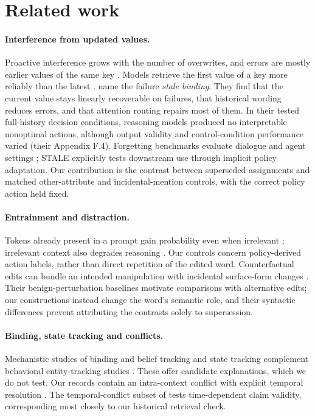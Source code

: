 \section{Related work}
\label{sec:related}

\paragraph{Interference from updated values.} Proactive interference grows with the number of overwrites,
and errors are mostly earlier values of the same key \citep{wang2026unable}. Models retrieve the first value
of a key more reliably than the latest \citep{chattaraj2026dual,qiao2026retrieval}. \citet{guo2026context}
name the failure \emph{stale binding}. They find that the current value stays linearly recoverable on
failures, that historical wording reduces errors, and that attention routing repairs most of them. In
their tested full-history decision conditions, reasoning models produced no interpretable nonoptimal
actions, although output validity and control-condition performance varied (their Appendix F.4).
Forgetting benchmarks evaluate dialogue and agent settings \citep{qian2026forget,chao2026stale}; STALE
explicitly tests downstream use through implicit policy adaptation. Our contribution is the contrast
between superseded assignments and matched other-attribute and incidental-mention controls, with the
correct policy action held fixed.

\paragraph{Entrainment and distraction.} Tokens already present in a prompt gain probability even when
irrelevant \citep{niu2025entrainment}; irrelevant context also degrades reasoning \citep{shi2023distracted}.
Our controls concern policy-derived action labels, rather than direct repetition of the edited word.
Counterfactual edits can bundle an intended manipulation with incidental surface-form changes
\citep{yang2026compared}. Their benign-perturbation baselines motivate comparisons with alternative edits;
our constructions instead change the word's semantic role, and their syntactic differences prevent
attributing the contrasts solely to supersession.

\paragraph{Binding, state tracking and conflicts.} Mechanistic studies of binding and belief tracking
\citep{feng2024bind,gurarieh2026mixing,prakash2026lookbacks} and state tracking \citep{tang2026entities}
complement behavioral entity-tracking studies \citep{kim2023entity}. These offer candidate explanations,
which we do not test. Our records contain an intra-context conflict with explicit temporal resolution
\citep{xu2024conflicts}. The temporal-conflict subset of \citet{yang2026conflicts} tests time-dependent
claim validity, corresponding most closely to our historical retrieval check.
